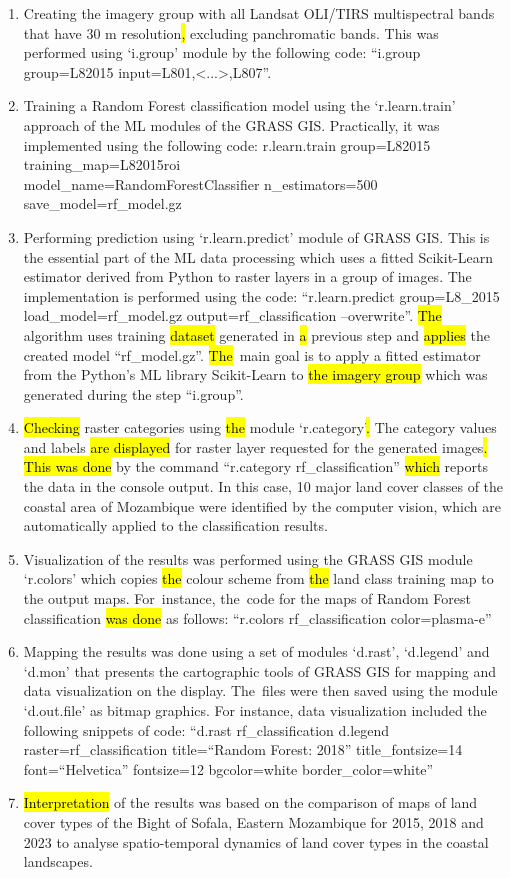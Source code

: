 \documentclass[coasts,article,accept,pdftex,oneauthor]{Definitions/mdpi}
\begin{document}
\begin{enumerate}
  \item Creating the imagery group with all Landsat OLI/TIRS {multispectral }bands {that have 30 m resolution\hl{, }excluding panchromatic bands. This was performed }using `i.group' module {by the following code: ``i.group group=L82015 input=L801,<...>,L807''}. 
  \item {Training} a Random Forest classification model using {the }`r.learn.train' approach of {the }ML modules of {the }GRASS GIS. {Practically, it was implemented using the following code: r.learn.train group=L82015 training\_map=L82015roi \\
  model\_name=RandomForestClassifier n\_estimators=500 save\_model=rf\_model.gz}
  \item Performing prediction using `r.learn.predict' module of GRASS GIS{. This is the essential part of the ML data processing }which uses a fitted Scikit-Learn estimator {derived} from Python to raster layers in a group of images. {The implementation is performed using the code: ``r.learn.predict group=L8\_2015 load\_model=rf\_model.gz output=rf\_classification --overwrite''. \hl{The} algorithm uses\hl{ }training \hl{dataset} generated in \hl{a }previous step and \hl{applies} the created model ``rf\_model.gz''. \hl{The}~main goal\hl{ }is to apply a fitted estimator from the Python's ML library Scikit-Learn to \hl{the imagery group }which was generated during the step ``i.group''.} 
  \item \hl{Checking} raster categories using \hl{the }module `r.category'\hl{. }{The category values and labels \hl{are displayed }for\hl{ }raster layer requested for the generated images\hl{. This was done }by the command ``r.category rf\_classification'' \hl{which} reports the data in the console output. In} this case, 10 major land cover classes of the coastal area of Mozambique were identified by the computer vision, which are automatically applied to the classification results.
  \item Visualization of the results {was performed }using {the GRASS GIS }module `r.colors' which copies \hl{the }colour scheme from \hl{the }land class training map to the output maps{. For~instance, the~code for the maps of Random Forest classification \hl{was done} as follows: ``r.colors rf\_classification color=plasma-e''}
  \item Mapping the results {was done }using a set of modules `d.rast', `d.legend' and `d.mon' {that presents the cartographic tools of GRASS GIS for mapping and data visualization on the display}. The~files were {then }saved using the module `d.out.file' as bitmap graphics. {For instance, data visualization included the following snippets of code: ``d.rast rf\_classification d.legend raster=rf\_classification title=``Random Forest: 2018'' title\_fontsize=14 font=``Helvetica'' fontsize=12 bgcolor=white border\_color=white''}
  \item \hl{Interpretation} of the results {was based on the} comparison of maps of land cover types of the Bight of Sofala, Eastern Mozambique for 2015, 2018 and 2023 {to analyse spatio-temporal dynamics of land cover types in the coastal landscapes}. 
\end{enumerate}  
\end{document}
